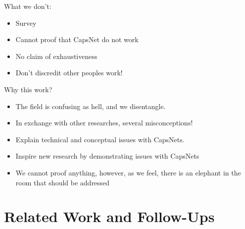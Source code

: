 \documentclass{article}
\begin{document}
What we don't:
\begin{itemize}
	\item Survey
	\item Cannot proof that CapsNet do not work
	\item No claim of exhaustiveness
	\item Don't discredit other peoples work!
\end{itemize}

Why this work?
\begin{itemize}
	\item The field is confusing as hell, and we disentangle.
	\item In exchange with other researches, several misconceptions!
	\item Explain technical and conceptual issues with CapsNets.
	\item Inspire new research by demonstrating issues with CapsNets
	\item We cannot proof anything, however, as we feel, there is an elephant in the room that should be addressed
\end{itemize}

\section{Related Work and Follow-Ups}
\end{document}
